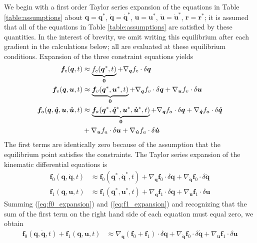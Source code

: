 \documentclass{svjour3}                     %
\begin{document}
We begin with a first order Taylor series expansion of the equations in Table
\ref{table:assumptions} about $\bm{q}=\bm{q}^*$, $\bm{\dot{q}}=\bm{\dot{q}}^*$,
$\bm{u}=\bm{u}^*$, $\bm{\dot{u}}=\bm{\dot{u}}^*$, $\bm{r}=\bm{r}^*$; it is
assumed that all of the equations in Table \ref{table:assumptions} are
satisfied by these quantities.  In the interest of brevity, we omit writing
this equilibrium after each gradient in the calculations below; all are
evaluated at these equilibrium conditions.  Expansion of the three constraint
equations yields
\begin{align}
  \label{eq:configuration_expansion}
  \bm{f}_{c}(\bm{q}, t) &\approx \underbrace{f_{c}(\bm{q}^*, t)}_{\bm{0}} +
    \nabla_{\bm{q}}f_{c} \cdot \delta \bm{q}\\
  \label{eq:velocity_expansion}
  \bm{f}_{v}(\bm{q}, \bm{u}, t) &\approx \underbrace{\bm{f}_{v}(\bm{q}^*,
  \bm{u}^*, t)}_{\bm{0}} +  \nabla_{\bm{q}}f_{v} \cdot \delta \bm{q} +
  \nabla_{\bm{u}}f_{v} \cdot \delta \bm{u} \\
  \label{eq:acceleration_expansion}
  \bm{f}_{a}(\bm{q}, \bm{\dot{q}}, \bm{u}, \bm{\dot{u}}, t) &\approx
  \underbrace{\bm{f}_{a}(\bm{q}^*, \bm{\dot{q}}^*, \bm{u}^*, \bm{\dot{u}}^*,
t)}_{\bm{0}} +  \nabla_{\bm{q}}f_{a} \cdot \delta \bm{q} + \nabla_{\bm{\dot{q}}}f_{a}
\cdot \delta \bm{\dot{q}} \notag\\
&+ \nabla_{\bm{u}}f_{a} \cdot \delta \bm{u} + \nabla_{\bm{\dot{u}}}f_{a} \cdot
\delta \bm{\dot{u}}
\end{align}
The first terms are identically zero because of the assumption that the
equilibrium point satisfies the constraints.  The Taylor series expansion of
the kinematic differential equations is
\begin{align}
  \label{eq:f0_expansion}
  \bm{f}_{0}(\bm{q}, \bm{\dot{q}}, t) &\approx \bm{f}_{0}(\bm{q}^*,
  \bm{\dot{q}}^*, t) + \nabla_{\bm{q}}\bm{f}_{0} \cdot \delta\bm{q} +
  \nabla_{\bm{\dot{q}}}\bm{f}_{0} \cdot \delta\bm{\dot{q}}\\
  \label{eq:f1_expansion}
  \bm{f}_{1}(\bm{q}, \bm{u}, t) &\approx \bm{f}_{1}(\bm{q}^*,
  \bm{u}^*, t) + \nabla_{\bm{q}}\bm{f}_{1} \cdot \delta\bm{q} +
  \nabla_{\bm{u}}\bm{f}_{1} \cdot \delta\bm{u}
\end{align}
Summing (\ref{eq:f0_expansion}) and (\ref{eq:f1_expansion}) and recognizing
that the sum of the first term on the right hand side of each equation must
equal zero, we obtain
\begin{align}
  \label{eq:f0_plus_f1_expansion}
  \bm{f}_{0}(\bm{q}, \bm{\dot{q}}, t) + \bm{f}_{1}(\bm{q}, \bm{u}, t) &\approx
  \nabla_{\bm{q}}(\bm{f}_{0} + \bm{f}_{1}) \cdot \delta\bm{q} +
  \nabla_{\bm{\dot{q}}}\bm{f}_{0} \cdot \delta\bm{\dot{q}} +
  \nabla_{\bm{u}}\bm{f}_{1} \cdot \delta\bm{u}
\end{align}
\end{document}
